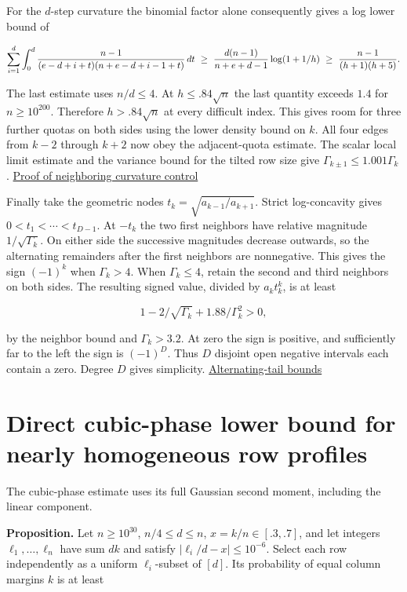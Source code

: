 \documentclass[11pt]{article}
\begin{document}
For the $d$-step curvature the binomial factor alone consequently gives a log lower bound of

\[
\sum_{i=1}^d\int_0^d\frac{n-1}{(e-d+i+t)(n+e-d+i-1+t)}\thinspace{}dt
\ \ge\ \frac{d(n-1)}{n+e+d-1}\log(1+1/h)
\ \ge\ \frac{n-1}{(h+1)(h+5)} .
\]

The last estimate uses $n/d\le4$. At $h\le .84\sqrt n$ the last quantity exceeds $1.4$ for $n\ge10^{200}$. Therefore $h>.84\sqrt n$ at every difficult index. This gives room for three further quotas on both sides using the lower density bound on $k$. All four edges from $k-2$ through $k+2$ now obey the adjacent-quota estimate. The scalar local limit estimate and the variance bound for the tilted row size give $\Gamma_{k\pm1}\le1.001\Gamma_k$. \href{https://github.com/ProgramComputer/open-math-research/blob/main/topics/balanced-arrays/adjacent-quotas/scalar.md}{Proof of neighboring curvature control}

Finally take the geometric nodes $t_k=\sqrt{a_{k-1}/a_{k+1}}$. Strict log-concavity gives $0<t_1<\cdots<t_{D-1}$. At $-t_k$ the two first neighbors have relative magnitude $1/\sqrt{\Gamma_k}$. On either side the successive magnitudes decrease outwards, so the alternating remainders after the first neighbors are nonnegative. This gives the sign $(-1)^k$ when $\Gamma_k>4$. When $\Gamma_k\le4$, retain the second and third neighbors on both sides. The resulting signed value, divided by $a_k t_k^k$, is at least

\[
1-2/\sqrt{\Gamma_k}+1.88/\Gamma_k^2>0,
\]

by the neighbor bound and $\Gamma_k>3.2$. At zero the sign is positive, and sufficiently far to the left the sign is $(-1)^D$. Thus $D$ disjoint open negative intervals each contain a zero. Degree $D$ gives simplicity. \href{https://github.com/ProgramComputer/open-math-research/blob/main/topics/balanced-arrays/adjacent-quotas/scalar.md}{Alternating-tail bounds}

\section{Direct cubic-phase lower bound for nearly homogeneous row profiles}

The cubic-phase estimate uses its full Gaussian second moment, including the linear component.

\textbf{Proposition.} Let $n\ge10^{30}$, $n/4\le d\le n$, $x=k/n\in[.3,.7]$, and let integers $\ell_1,\dots,\ell_n$ have sum $dk$ and satisfy $|\ell_i/d-x|\le10^{-6}$. Select each row independently as a uniform $\ell_i$-subset of $[d]$. Its probability of equal column margins $k$ is at least
\end{document}
